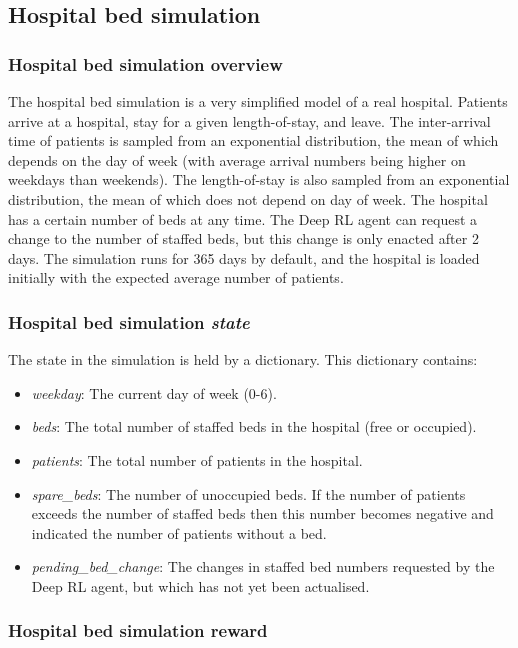 \documentclass{article}
\begin{document}
\begin{multicols}{2}
\subsection{Hospital bed simulation}

\subsubsection{Hospital bed simulation overview}

The hospital bed simulation is a very simplified model of a real hospital. Patients arrive at a hospital, stay for a given length-of-stay, and leave. The inter-arrival time of patients is sampled from an exponential distribution, the mean of which depends on the day of week (with average arrival numbers being higher on weekdays than weekends). The length-of-stay is also sampled from an exponential distribution, the mean of which does not depend on day of week. The hospital has a certain number of beds at any time. The Deep RL agent can request a change to the number of staffed beds, but this change is only enacted after 2 days. The simulation runs for 365 days by default, and the hospital is loaded initially with the expected average number of patients.

\subsubsection{Hospital bed simulation \emph{state}}

The state in the simulation is held by a dictionary. This dictionary contains:

\begin{itemize}
    \item \emph{weekday}: The current day of week (0-6).
    \item \emph{beds}: The total number of staffed beds in the hospital (free or occupied).
    \item \emph{patients}: The total number of patients in the hospital.
    \item \emph{spare\_beds}: The number of unoccupied beds. If the number of patients exceeds the number of staffed beds then this number becomes negative and indicated the number of patients without a bed.
    \item \emph{pending\_bed\_change}: The changes in staffed bed numbers requested by the Deep RL agent, but which has not yet been actualised.
\end{itemize}

\subsubsection{Hospital bed simulation reward}


\end{multicols}
\end{document}
